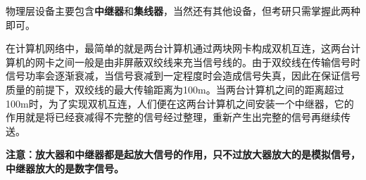 物理层设备主要包含\textbf{中继器}和\textbf{集线器}，当然还有其他设备，但考研只需掌握此两种即可。

在计算机网络中，最简单的就是两台计算机通过两块网卡构成双机互连，这两台计算机的网卡之间一般是由非屏蔽双绞线来充当信号线的。由于双绞线在传输信号时信号功率会逐渐衰减，当信号衰减到一定程度时会造成信号失真，因此在保证信号质量的前提下，双绞线的最大传输距离为100m。当两台计算机之间的距离超过100m时，为了实现双机互连，人们便在这两台计算机之间安装一个中继器，它的作用就是将已经衰减得不完整的信号经过整理，重新产生出完整的信号再继续传送。

{\textbf{注意：放大器和中继器都是起放大信号的作用，只不过放大器放大的是模拟信号，中继器放大的是数字信号。}}
